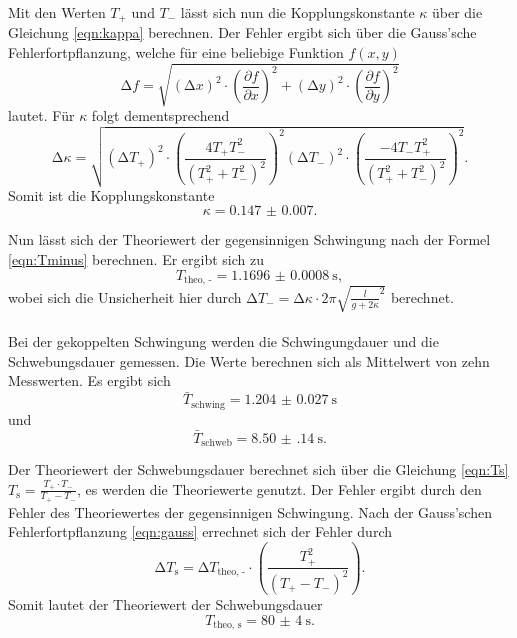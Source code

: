   \noindent Mit den Werten $T_{+}$ und $T_{-}$ lässt sich nun die Kopplungskonstante $\kappa$ über die Gleichung \eqref{eqn:kappa} berechnen. Der Fehler ergibt sich über die 
  Gauss'sche Fehlerfortpflanzung, welche für eine beliebige Funktion $f(x,y) $ 
  \begin{equation} \label{eqn:gauss}
    \increment f = \sqrt{(\increment x)^2 \cdot \left(\frac{\partial f}{\partial x}\right)^2 + (\increment y)^2 \cdot \left(\frac{\partial f}{\partial y}\right)^2}
  \end{equation}
  lautet. Für $\kappa $ folgt dementsprechend 
  \begin{equation} \label{eqn:fehlerk}
    \increment \kappa = \sqrt{(\increment T_{+})^2 \cdot \left( \frac{4 T_{+} T_{-}^2}{(T_{+}^2 + T_{-}^2)^2}\right)^2
                           (\increment T_{-})^2 \cdot \left( \frac{-4 T_{-} T_{+}^2}{(T_{+}^2 + T_{-}^2)^2}\right)^2 }. 
  \end{equation} 
  Somit ist die Kopplungskonstante 
  \begin{equation*}
    \kappa = \num{0.147(7)}.
  \end{equation*}

  \noindent Nun lässt sich der Theoriewert der gegensinnigen Schwingung nach der Formel \eqref{eqn:Tminus} berechnen. Er ergibt sich zu 
  \begin{equation*}
    T_{\text{theo, -}} = \SI{1.1696(8)}{\second}, 
  \end{equation*} 
  wobei sich die Unsicherheit hier durch $\increment T_{-} = \increment \kappa \cdot 2 \pi \sqrt{\frac{l}{g + 2\kappa }^2} $ berechnet. \\ \\

  \noindent Bei der gekoppelten Schwingung werden die Schwingungdauer und die Schwebungsdauer gemessen. Die Werte berechnen sich als Mittelwert von zehn Messwerten.
  Es ergibt sich
  \begin{equation*}
    \bar{T}_{\text{schwing}} = \SI{1.204(27)}{\second}
  \end{equation*} 
  und
  \begin{equation*}
    \bar{T}_{\text{schweb}} = \SI{8.50(14)}{\second}.
  \end{equation*}

  \noindent Der Theoriewert der Schwebungsdauer berechnet sich über die Gleichung \eqref{eqn:Ts} $T_{\text{s}} = \frac{T_{+} \cdot T_{-}}{T_{+} - T_{-}}$, es werden
  die Theoriewerte genutzt. Der Fehler ergibt durch den Fehler des Theoriewertes der gegensinnigen Schwingung. Nach der Gauss'schen Fehlerfortpflanzung \eqref{eqn:gauss}
  errechnet sich der Fehler durch 
  \begin{equation}\label{eqn:fehlerts}
    \increment T_{\text{s}} = \increment T_{\text{theo, -}} \cdot \left(\frac{T_{+}^2}{(T_{+} - T_{-})^2}\right).
  \end{equation}
  Somit lautet der Theoriewert der Schwebungsdauer
  \begin{equation*}
    T_ {\text{theo, s}} = \SI{80(4)}{\second}. 
  \end{equation*} \\ \\

